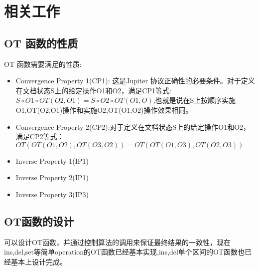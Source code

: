 \chapter{相关工作}
\section{OT 函数的性质}
	OT 函数需要满足的性质:
	\begin{itemize}
	  \item Convergence Property 1(CP1): 这是Jupiter 协议正确性的必要条件。对于定义在文档状态S上的给定操作O1和O2，满足CP1等式:$S \circ O1 \circ OT(O2,O1) = S \circ O2 \circ OT(O1,O)$,也就是说在S上按顺序实施O1,OT(O2,O1)操作和实施O2,OT(O1,O2)操作效果相同。
	  \item Convergence Property 2(CP2):对于定义在文档状态S上的给定操作O1和O2，满足CP2等式：$OT(OT(O1,O2),OT(O3,O2)) = OT(OT(O1,O3),OT(O2,O3))$
	  \item Inverse Property 1(IP1)
	  \item Inverse Property 2(IP1)
	  \item Inverse Property 3(IP3)
	\end{itemize}
	
\section{OT函数的设计}
可以设计OT函数，并通过控制算法的调用来保证最终结果的一致性，现在ins,del,set等简单operation的OT函数已经基本实现,ins,del单个区间的OT函数也已经基本上设计完成。

